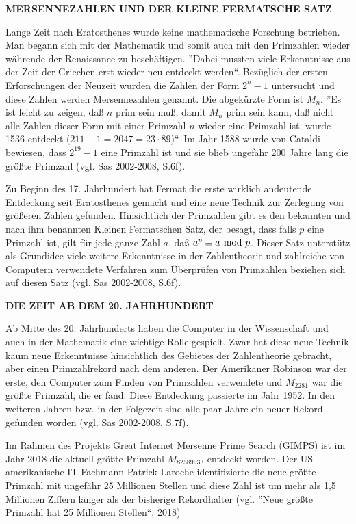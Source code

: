 \textbf{MERSENNEZAHLEN UND DER KLEINE FERMATSCHE SATZ}

Lange Zeit nach Eratosthenes wurde keine mathematische
Forschung betrieben. Man begann sich mit der Mathematik
und somit auch mit den Primzahlen wieder währende der 
Renaissance zu beschäftigen. ''Dabei mussten viele
Erkenntnisse aus der Zeit der Griechen erst wieder neu
entdeckt werden``. Bezüglich der ersten Erforschungen
der Neuzeit wurden die Zahlen der Form $2^{n}-1$
untersucht und diese Zahlen werden Mersennezahlen genannt.
Die abgekürzte Form ist $M_n$. ''Es ist leicht zu zeigen,
daß $n$ prim sein muß, damit $M_n$ prim sein kann, daß
nicht alle Zahlen dieser Form mit einer Primzahl $n$
wieder eine Primzahl ist, wurde 1536 entdeckt 
($211 - 1 = 2047 = 23 \cdot 89$)``. Im Jahr 1588 wurde von
Cataldi bewiesen, dass $2^{19} - 1$ eine Primzahl ist
und sie blieb ungefähr 200 Jahre lang die größte Primzahl
(vgl. Sas 2002-2008, S.6f).

Zu Beginn des 17. Jahrhundert hat Fermat die erste
wirklich andeutende Entdeckung seit Eratosthenes gemacht
und eine neue Technik zur Zerlegung von größeren Zahlen
gefunden. Hinsichtlich der Primzahlen gibt es den bekannten
und nach ihm benannten Kleinen Fermatschen Satz, der besagt,
dass falls $p$ eine Primzahl ist, gilt für jede ganze Zahl
$a$, daß $a^p \equiv a \mskip-5mu\mod p$. Dieser Satz unterstütz als
Grundidee viele weitere Erkenntnisse in der Zahlentheorie
und zahlreiche von Computern verwendete Verfahren zum
Überprüfen von Primzahlen beziehen sich auf diesen Satz
(vgl. Sas 2002-2008, S.6f).
\vspace*{.4cm}

\textbf{DIE ZEIT AB DEM 20. JAHRHUNDERT}

Ab Mitte des 20. Jahrhunderts haben die Computer in der
Wissenschaft und auch in der Mathematik eine wichtige
Rolle gespielt. Zwar hat diese neue Technik kaum neue
Erkenntnisse hinsichtlich des Gebietes der Zahlentheorie
gebracht, aber einen Primzahlrekord nach dem anderen.
Der Amerikaner Robinson war der erste, den Computer zum
Finden von Primzahlen verwendete und $M_{2281}$ war die
größte Primzahl, die er fand. Diese Entdeckung passierte
im Jahr 1952. In den weiteren Jahren bzw. in der Folgezeit
sind alle paar Jahre ein neuer Rekord gefunden worden
(vgl. Sas 2002-2008, S.7f).

Im Rahmen des Projekts Great Internet Mersenne Prime Search
(GIMPS) ist im Jahr 2018 die aktuell größte Primzahl
$M_{82589933}$ entdeckt worden. Der US-amerikanische
IT-Fachmann Patrick Laroche identifizierte die neue größte
Primzahl mit ungefähr 25 Millionen Stellen und diese Zahl
ist um mehr als 1,5 Millionen Ziffern länger als der
bisherige Rekordhalter
(vgl. ''Neue größte Primzahl hat 25 Millionen Stellen``, 2018)

